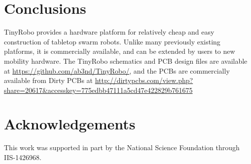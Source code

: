 \documentclass[letterpaper, 10 pt, conference]{ieeeconf}  %
\begin{document}
\section{Conclusions}

TinyRobo provides a hardware platform for relatively cheap and easy construction of tabletop swarm robots.
Unlike many previously existing platforms, it is commercially available, and can be extended by users to new mobility hardware. 
The TinyRobo schematics and PCB design files are available at \url{https://github.com/ab3nd/TinyRobo/}, and the PCBs are commercially available from Dirty PCBs at  \url{http://dirtypcbs.com/view.php?share=20617&accesskey=775edbb47111a5cd47e422829b761675}

\section{Acknowledgements}

This work was supported in part by the National Science Foundation through IIS-1426968. 



\end{document}
